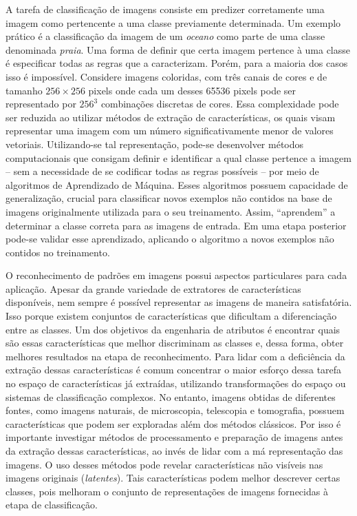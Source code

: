 A tarefa de classificação de imagens consiste em predizer corretamente uma imagem como pertencente a uma classe previamente determinada. Um exemplo prático é a classificação da imagem de um \textit{oceano} como parte de uma classe denominada \textit{praia}. Uma forma de definir que certa imagem pertence à uma classe é especificar todas as regras que a caracterizam.
Porém, para a maioria dos casos isso é impossível. Considere imagens coloridas, com três canais de cores e de tamanho $256\times256$ pixels onde cada um desses 65536 pixels pode ser representado por $256^3$ combinações discretas de cores. Essa complexidade pode ser reduzida ao utilizar métodos de extração de características, os quais visam representar uma imagem com um número significativamente menor de valores vetoriais. Utilizando-se tal representação, pode-se desenvolver métodos computacionais que consigam definir e identificar a qual classe pertence a imagem -- sem a necessidade de se codificar todas as regras possíveis -- por meio de algoritmos de Aprendizado de Máquina. Esses algoritmos possuem capacidade de generalização, crucial para classificar novos exemplos não contidos na base de imagens originalmente utilizada para o seu treinamento. Assim, ``aprendem'' a determinar a classe correta para as imagens de entrada. Em uma etapa posterior pode-se validar esse aprendizado, aplicando o algoritmo a novos exemplos não contidos no treinamento.

O reconhecimento de padrões em imagens possui aspectos particulares para cada aplicação. Apesar da grande variedade de extratores de características disponíveis, nem sempre é possível representar as imagens de maneira satisfatória. Isso porque existem conjuntos de características que dificultam a diferenciação entre as classes. Um dos objetivos da engenharia de atributos é encontrar quais são essas características que melhor discriminam as classes e, dessa forma, obter melhores resultados na etapa de reconhecimento. Para lidar com a deficiência da extração dessas características é comum concentrar o maior esforço dessa tarefa no espaço de características já extraídas, utilizando transformações do espaço ou sistemas de classificação complexos. No entanto, imagens obtidas de diferentes fontes, como imagens naturais, de microscopia, telescopia e tomografia, possuem características que podem ser exploradas além dos métodos clássicos. Por isso é importante investigar métodos de processamento e preparação de imagens antes da extração dessas características, ao invés de lidar com a má representação das imagens. O uso desses métodos pode revelar características não visíveis nas imagens originais (\textit{latentes}). Tais características podem melhor descrever certas classes, pois melhoram o conjunto de representações de imagens fornecidas à etapa de classificação.

